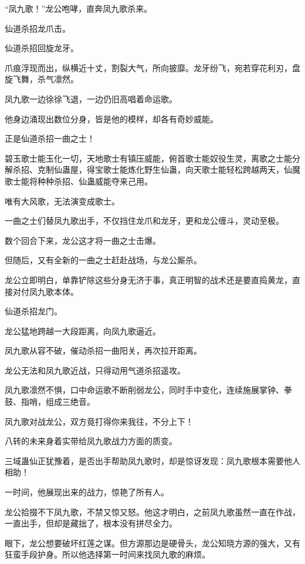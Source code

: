 
\begin{this_body}

“凤九歌！”龙公咆哮，直奔凤九歌杀来。

仙道杀招龙爪击。

仙道杀招回旋龙牙。

爪痕浮现而出，纵横近十丈，割裂大气，所向披靡。龙牙纷飞，宛若穿花利刃，盘旋飞舞，杀气凛然。

凤九歌一边徐徐飞退，一边仍旧高唱着命运歌。

他身边涌现出数位分身，皆是他的模样，却各有奇妙威能。

正是仙道杀招一曲之士！

碧玉歌士能玉化一切，天地歌士有镇压威能，俯首歌士能奴役生灵，离歌之士能分解杀招、克制仙蛊屋，得宝歌士能炼化野生仙蛊，向天歌士能轻松跨越两天，仙魔歌士能将种种杀招、仙蛊威能夺来己用。

唯有大风歌，无法演变成歌士。

一曲之士们替凤九歌出手，不仅挡住龙爪和龙牙，更和龙公缠斗，灵动至极。

数个回合下来，龙公这才将一曲之士击爆。

但随后，又有全新的一曲之士赶赴战场，与龙公厮杀。

龙公立即明白，单靠铲除这些分身无济于事，真正明智的战术还是要直捣黄龙，直接对付凤九歌本体。

仙道杀招龙门。

龙公猛地跨越一大段距离，向凤九歌逼近。

凤九歌从容不破，催动杀招一曲阳关，再次拉开距离。

龙公无法和凤九歌近战，只得动用气道杀招遥攻。

凤九歌凛然不惧，口中命运歌不断削弱龙公，同时手中变化，连续施展掌钟、拳鼓、指哨，组成三绝音。

凤九歌对战龙公，双方竟打得你来我往，不分上下！

八转的未来身着实带给凤九歌战力方面的质变。

三域蛊仙正犹豫着，是否出手帮助凤九歌时，却是惊讶发现：凤九歌根本需要他人相助！

一时间，他展现出来的战力，惊艳了所有人。

龙公拾掇不下凤九歌，不禁又惊又怒。他这才明白，之前凤九歌虽然一直在作战，一直出手，但却是藏拙了，根本没有拼尽全力。

眼下，龙公想要破坏红莲之谋。但方源那边是硬骨头，龙公知晓方源的强大，又有狂蛮手段护身。所以他选择第一时间来找凤九歌的麻烦。


\end{this_body}
